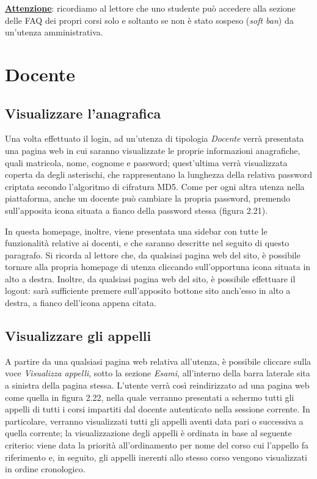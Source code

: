 \documentclass [a4paper,11pt]{book}
\begin{document}
\medskip

\textbf{\underline{Attenzione}}: ricordiamo al lettore che uno studente può accedere alla sezione delle FAQ dei propri corsi solo e soltanto se non è stato sospeso (\emph{soft ban}) da un'utenza amministrativa.

\medskip
\medskip

\section{Docente}

\subsection{Visualizzare l'anagrafica}

Una volta effettuato il login, ad un'utenza di tipologia \emph{Docente} verrà presentata una pagina web in cui saranno visualizzate le proprie informazioni anagrafiche, quali matricola, nome, cognome e password; quest'ultima verrà visualizzata coperta da degli asterischi, che rappresentano la lunghezza della relativa password criptata secondo l'algoritmo di cifratura MD5. Come per ogni altra utenza nella piattaforma, anche un docente può cambiare la propria password, premendo sull'apposita icona situata a fianco della password stessa (figura 2.21). 


In questa homepage, inoltre, viene presentata una sidebar con tutte le funzionalità relative ai docenti, e che saranno descritte nel seguito di questo paragrafo. Si ricorda al lettore che, da qualsiasi pagina web del sito, è possibile tornare alla propria homepage di utenza cliccando sull'opportuna icona situata in alto a destra. Inoltre, da qualsiasi pagina web del sito, è possibile effettuare il logout: sarà sufficiente premere sull'apposito bottone sito anch'esso in alto a destra, a fianco dell'icona appena citata.

\medskip

\subsection{Visualizzare gli appelli}
\label{sec:visualizzaAppelli}

A partire da una qualsiasi pagina web relativa all'utenza, è possibile cliccare sulla voce \emph{Visualizza appelli}, sotto la sezione \emph{Esami}, all'interno della barra laterale sita a sinistra della pagina stessa. L'utente verrà così reindirizzato ad una pagina web come quella in figura 2.22, nella quale verranno presentati a schermo tutti gli appelli di tutti i corsi impartiti dal docente autenticato nella sessione corrente. In particolare, verranno visualizzati tutti gli appelli aventi data pari o successiva a quella corrente; la visualizzazione degli appelli è ordinata in base al seguente criterio: viene data la priorità all'ordinamento per nome del corso cui l'appello fa riferimento e, in seguito, gli appelli inerenti allo stesso corso vengono visualizzati in ordine cronologico.
\end{document}
